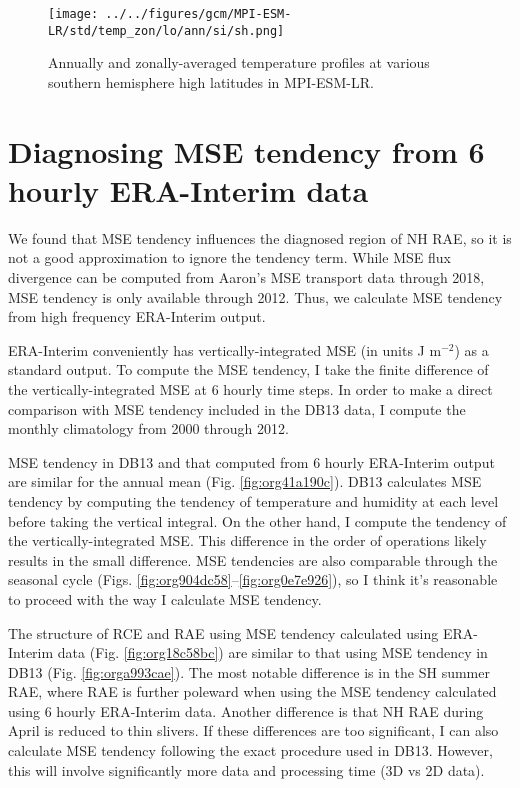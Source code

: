 \documentclass[11pt]{article}
\begin{document}
\begin{figure}[htbp]
\centering
\texttt{[image: ../../figures/gcm/MPI-ESM-LR/std/temp\_zon/lo/ann/si/sh.png]}
\caption{\label{fig:org323adda}Annually and zonally-averaged temperature profiles at various southern hemisphere high latitudes in MPI-ESM-LR.}
\end{figure}

\section{Diagnosing MSE tendency from 6 hourly ERA-Interim data}
\label{sec:org172d899}
We found that MSE tendency influences the diagnosed region of NH RAE, so it is not a good approximation to ignore the tendency term. While MSE flux divergence can be computed from Aaron's MSE transport data through 2018, MSE tendency is only available through 2012. Thus, we calculate MSE tendency from high frequency ERA-Interim output.

ERA-Interim conveniently has vertically-integrated MSE (in units J m\(^{-2}\)) as a standard output. To compute the MSE tendency, I take the finite difference of the vertically-integrated MSE at 6 hourly time steps. In order to make a direct comparison with MSE tendency included in the DB13 data, I compute the monthly climatology from 2000 through 2012.

MSE tendency in DB13 and that computed from 6 hourly ERA-Interim output are similar for the annual mean (Fig. \ref{fig:org41a190c}). DB13 calculates MSE tendency by computing the tendency of temperature and humidity at each level before taking the vertical integral. On the other hand, I compute the tendency of the vertically-integrated MSE. This difference in the order of operations likely results in the small difference. MSE tendencies are also comparable through the seasonal cycle (Figs. \ref{fig:org904dc58}--\ref{fig:org0e7e926}), so I think it's reasonable to proceed with the way I calculate MSE tendency.

The structure of RCE and RAE using MSE tendency calculated using ERA-Interim data (Fig. \ref{fig:org18c58bc}) are similar to that using MSE tendency in DB13 (Fig. \ref{fig:orga993cae}). The most notable difference is in the SH summer RAE, where RAE is further poleward when using the MSE tendency calculated using 6 hourly ERA-Interim data. Another difference is that NH RAE during April is reduced to thin slivers. If these differences are too significant, I can also calculate MSE tendency following the exact procedure used in DB13. However, this will involve significantly more data and processing time (3D vs 2D data).
\end{document}
